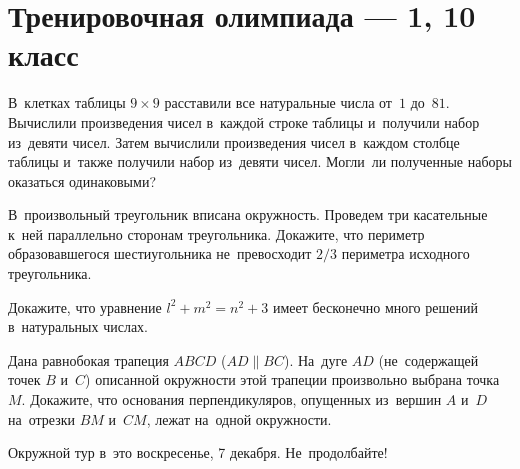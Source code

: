 
\section*{Тренировочная олимпиада --- 1, 10 класс}


\begin{problems}

\item
В~клетках таблицы $9 \times 9$ расставили все натуральные числа от~$1$ до~$81$.
Вычислили произведения чисел в~каждой строке таблицы и~получили набор из~девяти
чисел.
Затем вычислили произведения чисел в~каждом столбце таблицы и~также получили
набор из~девяти чисел.
Могли~ли полученные наборы оказаться одинаковыми?

\item
В~произвольный треугольник вписана окружность.
Проведем три касательные к~ней параллельно сторонам треугольника.
Докажите, что периметр образовавшегося шестиугольника не~превосходит $2/3$
периметра исходного треугольника.

\item
Докажите, что уравнение $l^2 + m^2 = n^2 + 3$ имеет бесконечно много решений
в~натуральных числах.

\item
Дана равнобокая трапеция $ABCD$ ($AD \parallel BC$).
На~дуге $AD$ (не~содержащей точек $B$ и~$C$) описанной окружности этой трапеции
произвольно выбрана точка $M$.
Докажите, что основания перпендикуляров, опущенных из~вершин $A$ и~$D$
на~отрезки $BM$ и~$CM$, лежат на~одной окружности.

\end{problems}

\begin{center}\small\sffamily
Окружной тур в~это воскресенье, 7 декабря.
Не~продолбайте!
\end{center}

